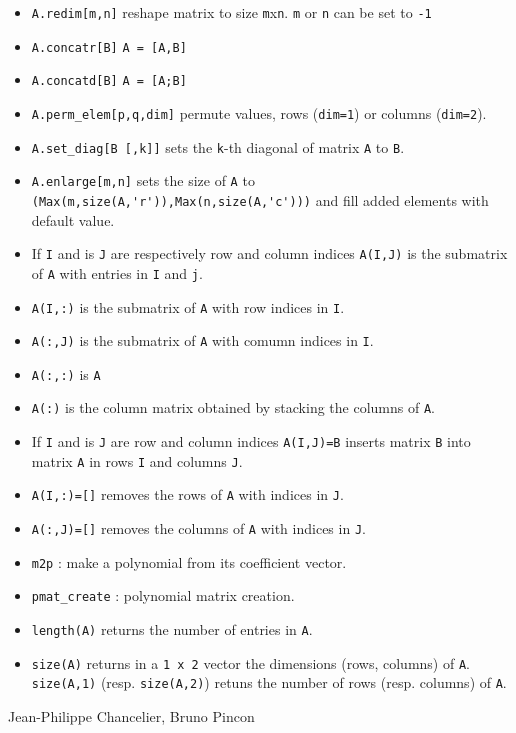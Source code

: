 \begin{itemize}
\item \verb+A.redim[m,n]+ reshape matrix to size \verb+m+x\verb+n+. \verb+m+ or \verb+n+ can be set to \verb+-1+ 
\item \verb+A.concatr[B]+ \verb+A = [A,B]+
\item \verb+A.concatd[B]+ \verb+A = [A;B]+
\item \verb+A.perm_elem[p,q,dim]+ permute values, rows (\verb+dim=1+) or columns (\verb+dim=2+).
\item \verb+A.set_diag[B [,k]]+ sets the \verb+k+-th diagonal of matrix \verb+A+ to \verb+B+.
\item \verb+A.enlarge[m,n]+ sets the size of \verb+A+ to \verb+(Max(m,size(A,'r')),Max(n,size(A,'c')))+ and fill 
  added elements with default value.
\end{itemize}

\begin{itemize}
   \item If \verb+I+ and is \verb+J+ are respectively row and column indices \verb+A(I,J)+ is the submatrix of \verb+A+ with entries in \verb+I+ and \verb+j+.
   \item \verb+A(I,:)+ is the submatrix of \verb+A+ with row indices in \verb+I+.
   \item \verb+A(:,J)+ is the submatrix of \verb+A+ with comumn indices in \verb+I+.
   \item \verb+A(:,:)+ is \verb+A+
   \item \verb+A(:)+  is the column matrix obtained by stacking the columns of \verb+A+.
\end{itemize}

\begin{itemize}
   \item If \verb+I+ and is \verb+J+ are row and column indices \verb+A(I,J)=B+ inserts
     matrix \verb+B+ into matrix \verb+A+ in rows \verb+I+ and columns \verb!J!.
   \item \verb+A(I,:)=[]+ removes the rows of \verb+A+ with indices in \verb+J+.
   \item \verb+A(:,J)=[]+ removes the columns of \verb+A+ with indices in \verb+J+.
\end{itemize}

\begin{itemize}
   \item \verb+m2p+ : make a polynomial from its coefficient vector.
   \item \verb+pmat_create+ : polynomial matrix creation.
   \item \verb+length(A)+ returns the number of entries in \verb+A+.
   \item \verb+size(A)+ returns in a \verb+1 x 2+ vector the dimensions (rows, columns)
     of \verb+A+. \verb+size(A,1)+ (resp. \verb+size(A,2)+) retuns the number of rows 
     (resp. columns) of \verb+A+.
\end{itemize}

\begin{manseealso}

\end{manseealso}

\begin{authors}
   Jean-Philippe Chancelier, Bruno Pincon
\end{authors}
